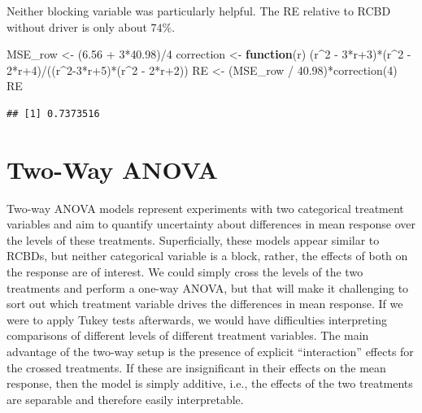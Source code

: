 \documentclass[
]{book}
\newenvironment{Shaded}{\begin{snugshade}}{\end{snugshade}}
\newcommand{\ControlFlowTok}[1]{\textcolor[rgb]{0.13,0.29,0.53}{\textbf{#1}}}
\newcommand{\DecValTok}[1]{\textcolor[rgb]{0.00,0.00,0.81}{#1}}
\newcommand{\FloatTok}[1]{\textcolor[rgb]{0.00,0.00,0.81}{#1}}
\newcommand{\FunctionTok}[1]{\textcolor[rgb]{0.00,0.00,0.00}{#1}}
\newcommand{\NormalTok}[1]{#1}
\newcommand{\OtherTok}[1]{\textcolor[rgb]{0.56,0.35,0.01}{#1}}
\newcommand{\SpecialCharTok}[1]{\textcolor[rgb]{0.00,0.00,0.00}{#1}}
\begin{document}
Neither blocking variable was particularly helpful. The RE relative to RCBD without driver is only about \(74\%\).

\begin{Shaded}
\begin{Highlighting}[]
\NormalTok{MSE\_row }\OtherTok{\textless{}{-}}\NormalTok{ (}\FloatTok{6.56} \SpecialCharTok{+} \DecValTok{3}\SpecialCharTok{*}\FloatTok{40.98}\NormalTok{)}\SpecialCharTok{/}\DecValTok{4}
\NormalTok{correction }\OtherTok{\textless{}{-}} \ControlFlowTok{function}\NormalTok{(r)  (r}\SpecialCharTok{\^{}}\DecValTok{2} \SpecialCharTok{{-}} \DecValTok{3}\SpecialCharTok{*}\NormalTok{r}\SpecialCharTok{+}\DecValTok{3}\NormalTok{)}\SpecialCharTok{*}\NormalTok{(r}\SpecialCharTok{\^{}}\DecValTok{2} \SpecialCharTok{{-}} \DecValTok{2}\SpecialCharTok{*}\NormalTok{r}\SpecialCharTok{+}\DecValTok{4}\NormalTok{)}\SpecialCharTok{/}\NormalTok{((r}\SpecialCharTok{\^{}}\DecValTok{2{-}3}\SpecialCharTok{*}\NormalTok{r}\SpecialCharTok{+}\DecValTok{5}\NormalTok{)}\SpecialCharTok{*}\NormalTok{(r}\SpecialCharTok{\^{}}\DecValTok{2} \SpecialCharTok{{-}} \DecValTok{2}\SpecialCharTok{*}\NormalTok{r}\SpecialCharTok{+}\DecValTok{2}\NormalTok{))}
\NormalTok{RE }\OtherTok{\textless{}{-}}\NormalTok{ (MSE\_row }\SpecialCharTok{/} \FloatTok{40.98}\NormalTok{)}\SpecialCharTok{*}\FunctionTok{correction}\NormalTok{(}\DecValTok{4}\NormalTok{)}
\NormalTok{RE}
\end{Highlighting}
\end{Shaded}

\begin{verbatim}
## [1] 0.7373516
\end{verbatim}

\hypertarget{two-way-anova}{%
\chapter{Two-Way ANOVA}\label{two-way-anova}}

Two-way ANOVA models represent experiments with two categorical treatment variables and aim to quantify uncertainty about differences in mean response over the levels of these treatments. Superficially, these models appear similar to RCBDs, but neither categorical variable is a block, rather, the effects of both on the response are of interest. We could simply cross the levels of the two treatments and perform a one-way ANOVA, but that will make it challenging to sort out which treatment variable drives the differences in mean response. If we were to apply Tukey tests afterwards, we would have difficulties interpreting comparisons of different levels of different treatment variables. The main advantage of the two-way setup is the presence of explicit ``interaction'' effects for the crossed treatments. If these are insignificant in their effects on the mean response, then the model is simply additive, i.e., the effects of the two treatments are separable and therefore easily interpretable.
\end{document}

